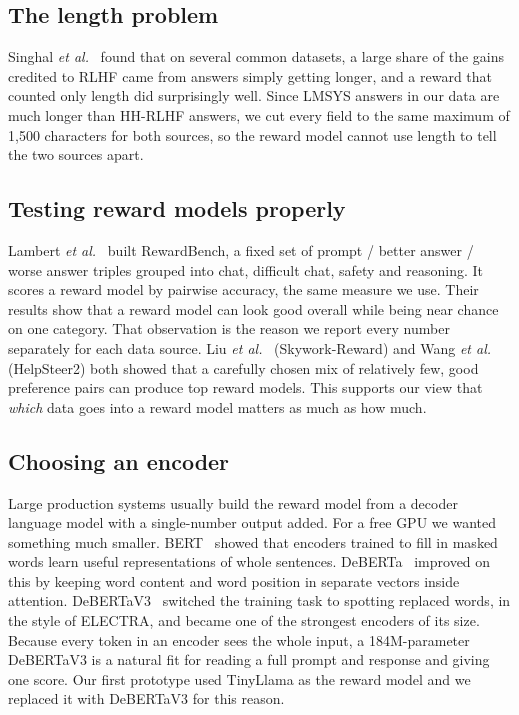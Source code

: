 \subsection{The length problem}
Singhal \emph{et al.}~\cite{singhal2023length} found that on several common datasets, a large share of the gains credited to RLHF came from answers simply getting longer, and a reward that counted only length did surprisingly well. Since LMSYS answers in our data are much longer than HH-RLHF answers, we cut every field to the same maximum of 1,500 characters for both sources, so the reward model cannot use length to tell the two sources apart.

\subsection{Testing reward models properly}
Lambert \emph{et al.}~\cite{lambert2024rewardbench} built RewardBench, a fixed set of prompt / better answer / worse answer triples grouped into chat, difficult chat, safety and reasoning. It scores a reward model by pairwise accuracy, the same measure we use. Their results show that a reward model can look good overall while being near chance on one category. That observation is the reason we report every number separately for each data source. Liu \emph{et al.}~\cite{liu2024skywork} (Skywork-Reward) and Wang \emph{et al.}~\cite{wang2024helpsteer2} (HelpSteer2) both showed that a carefully chosen mix of relatively few, good preference pairs can produce top reward models. This supports our view that \emph{which} data goes into a reward model matters as much as how much.

\subsection{Choosing an encoder}
Large production systems usually build the reward model from a decoder language model with a single-number output added. For a free GPU we wanted something much smaller. BERT~\cite{devlin2019bert} showed that encoders trained to fill in masked words learn useful representations of whole sentences. DeBERTa~\cite{he2021deberta} improved on this by keeping word content and word position in separate vectors inside attention. DeBERTaV3~\cite{he2023debertav3} switched the training task to spotting replaced words, in the style of ELECTRA, and became one of the strongest encoders of its size. Because every token in an encoder sees the whole input, a 184M-parameter DeBERTaV3 is a natural fit for reading a full prompt and response and giving one score. Our first prototype used TinyLlama as the reward model and we replaced it with DeBERTaV3 for this reason.

